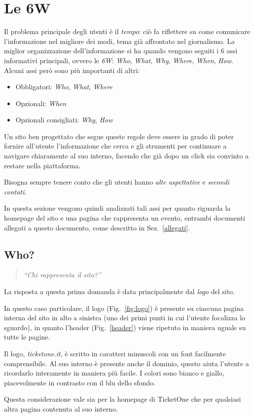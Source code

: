 \section{Le 6W}\label{6w}

Il problema principale degli utenti è il \textit{tempo}: ciò fa riflettere su come comunicare l'informazione nel migliore dei modi, tema già affrontato nel giornalismo.
La miglior organizzazione dell'informazione si ha quando vengono seguiti i 6 assi informativi principali, ovvero le \textit{6W}: \textit{Who}, \textit{What}, \textit{Why}, \textit{Where}, \textit{When}, \textit{How}.\\
Alcuni assi però sono più importanti di altri:
\begin{itemize}[noitemsep]
	\item Obbligatori: \textit{Who}, \textit{What}, \textit{Where}
	\item Opzionali: \textit{When}
	\item Opzionali consigliati: \textit{Why}, \textit{How}
\end{itemize}
\par Un sito ben progettato che segue queste regole deve essere in grado di poter fornire all'utente l'informazione che cerca e gli strumenti per continuare a navigare chiaramente al suo interno, facendo che già dopo un click sia convinto a restare nella piattaforma.
\par Bisogna sempre tenere conto che gli utenti hanno \textit{alte aspettative} e \textit{secondi contati}.
\par In questa sezione vengono quindi analizzati tali assi per quanto riguarda la homepage del sito e una pagina che rappresenta un evento, entrambi documenti allegati a questo documento, come descritto in Sez.~\ref{allegati}.

\subsection{Who?}
	\begin{quote}
	    \emph{``Chi rappresenta il sito?''}
	\end{quote}
	La risposta a questa prima domanda è data principalmente dal \textit{logo} del sito.
	\par In questo caso particolare, il logo (Fig.~\ref{fig:logo}) è presente su ciascuna pagina interna del sito in alto a sinistra (uno dei primi punti in cui l'utente focalizza lo sguardo), in quanto l'header (Fig.~\ref{header}) viene ripetuto in maniera uguale su tutte le pagine.
	\par Il logo, \textit{ticketone.it}, è scritto in caratteri minuscoli con un font facilmente comprensibile.
	Al suo interno è presente anche il dominio, questo aiuta l'utente a ricordarlo interamente in maniera più facile.
	I colori sono bianco e giallo, piacevolmente in contrasto con il blu dello sfondo.
	\par Questa considerazione vale sia per la homepage di TicketOne che per qualsiasi altra pagina contenuta al suo interno.
	
